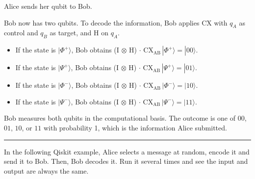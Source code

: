 \documentclass[letterpaper,10pt,english]{jupyterBook}
\begin{document}
\sphinxAtStartPar
{}Alice sends her qubit to Bob.

\sphinxAtStartPar
{}Bob now has two qubits.  To decode the information, Bob applies CX with \(q_A\) as control and \(q_B\) as target, and H on \(q_A\).
\begin{itemize}
\item {}
\sphinxAtStartPar
If the state is \(|\Phi^{+}\rangle\),  Bob obtains (I \(\otimes\) H) \(\cdot\) CX\(_\text{AB}\, |\Phi^{+}\rangle = |00\rangle\).

\item {}
\sphinxAtStartPar
If the state is \(|\Psi^{+}\rangle\),  Bob obtains (I \(\otimes\) H) \(\cdot\) CX\(_\text{AB}\, |\Psi^{+}\rangle = |01\rangle\).

\item {}
\sphinxAtStartPar
If the state is \(|\Phi^{-}\rangle\),  Bob obtains (I \(\otimes\) H) \(\cdot\) CX\(_\text{AB}\, |\Phi^{-}\rangle = |10\rangle\).

\item {}
\sphinxAtStartPar
If the state is \(|\Psi^{-}\rangle\),  Bob obtains (I \(\otimes\) H) \(\cdot\) CX\(_\text{AB}\, |\Psi^{-}\rangle = |11\rangle\).

\end{itemize}

\sphinxAtStartPar
{}Bob measures both qubits in the computational basis.  The outcome is one of \(00\), \(01\), \(10\), or \(11\) with probability 1, which is the information Alice submitted.


\bigskip\hrule\bigskip


\sphinxAtStartPar
{}In the following Qiskit example, Alice selects a message at random, encode it and send it to Bob.  Then, Bob decodes it.  Run it several times and see the input and output are always the same.
\end{document}

